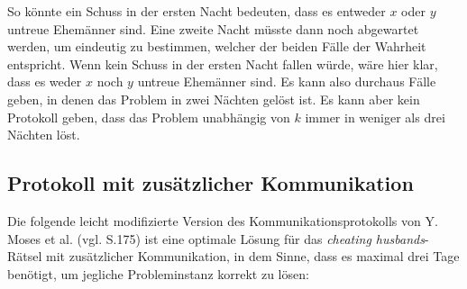 So könnte ein Schuss in der ersten Nacht bedeuten, dass es entweder $x$ oder $y$ untreue Ehemänner sind. Eine zweite Nacht müsste dann noch abgewartet werden, um eindeutig zu bestimmen, welcher der beiden Fälle der Wahrheit entspricht. Wenn kein Schuss in der ersten Nacht fallen würde, wäre hier klar, dass es weder $x$ noch $y$ untreue Ehemänner sind. Es kann also durchaus Fälle geben, in denen das Problem in zwei Nächten gelöst ist. Es kann aber kein Protokoll geben, dass das Problem unabhängig von $k$ immer in weniger als drei Nächten löst.\\

\subsection{Protokoll mit zusätzlicher Kommunikation}

Die folgende leicht modifizierte Version des Kommunikationsprotokolls von Y. Moses et al. \cite{moses1986cheating} (vgl. S.175) ist eine optimale Lösung für das \textit{cheating husbands}-Rätsel mit zusätzlicher Kommunikation, in dem Sinne, dass es maximal drei Tage benötigt, um jegliche Probleminstanz korrekt zu lösen:

